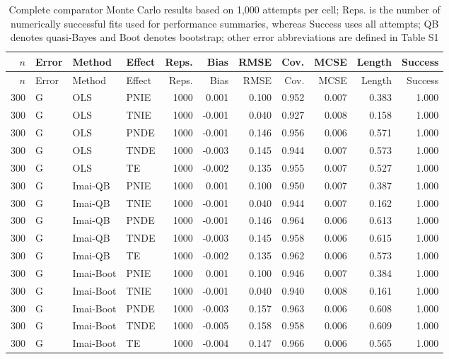 \begingroup
\footnotesize
\setlength{\tabcolsep}{2.1pt}
\begin{longtable}{rlllrrrrrrr}
\caption{Complete comparator Monte Carlo results based on 1,000 attempts per cell; Reps. is the number of numerically successful fits used for performance summaries, whereas Success uses all attempts; QB denotes quasi-Bayes and Boot denotes bootstrap; other error abbreviations are defined in Table S1}\label{tab:comparator_full}\\
\toprule
$n$ & Error & Method & Effect & Reps. & Bias & RMSE & Cov. & MCSE & Length & Success \\
\midrule
\endfirsthead
\toprule
$n$ & Error & Method & Effect & Reps. & Bias & RMSE & Cov. & MCSE & Length & Success \\
\midrule
\endhead
300 & G & OLS & PNIE & 1000 & 0.001 & 0.100 & 0.952 & 0.007 & 0.383 & 1.000 \\
300 & G & OLS & TNIE & 1000 & -0.001 & 0.040 & 0.927 & 0.008 & 0.158 & 1.000 \\
300 & G & OLS & PNDE & 1000 & -0.001 & 0.146 & 0.956 & 0.006 & 0.571 & 1.000 \\
300 & G & OLS & TNDE & 1000 & -0.003 & 0.145 & 0.944 & 0.007 & 0.573 & 1.000 \\
300 & G & OLS & TE & 1000 & -0.002 & 0.135 & 0.955 & 0.007 & 0.527 & 1.000 \\
300 & G & Imai-QB & PNIE & 1000 & 0.001 & 0.100 & 0.950 & 0.007 & 0.387 & 1.000 \\
300 & G & Imai-QB & TNIE & 1000 & -0.001 & 0.040 & 0.944 & 0.007 & 0.162 & 1.000 \\
300 & G & Imai-QB & PNDE & 1000 & -0.001 & 0.146 & 0.964 & 0.006 & 0.613 & 1.000 \\
300 & G & Imai-QB & TNDE & 1000 & -0.003 & 0.145 & 0.958 & 0.006 & 0.615 & 1.000 \\
300 & G & Imai-QB & TE & 1000 & -0.002 & 0.135 & 0.962 & 0.006 & 0.573 & 1.000 \\
300 & G & Imai-Boot & PNIE & 1000 & 0.001 & 0.100 & 0.946 & 0.007 & 0.384 & 1.000 \\
300 & G & Imai-Boot & TNIE & 1000 & -0.001 & 0.040 & 0.940 & 0.008 & 0.161 & 1.000 \\
300 & G & Imai-Boot & PNDE & 1000 & -0.003 & 0.157 & 0.963 & 0.006 & 0.608 & 1.000 \\
300 & G & Imai-Boot & TNDE & 1000 & -0.005 & 0.158 & 0.958 & 0.006 & 0.609 & 1.000 \\
300 & G & Imai-Boot & TE & 1000 & -0.004 & 0.147 & 0.966 & 0.006 & 0.565 & 1.000 \\

\end{longtable}
